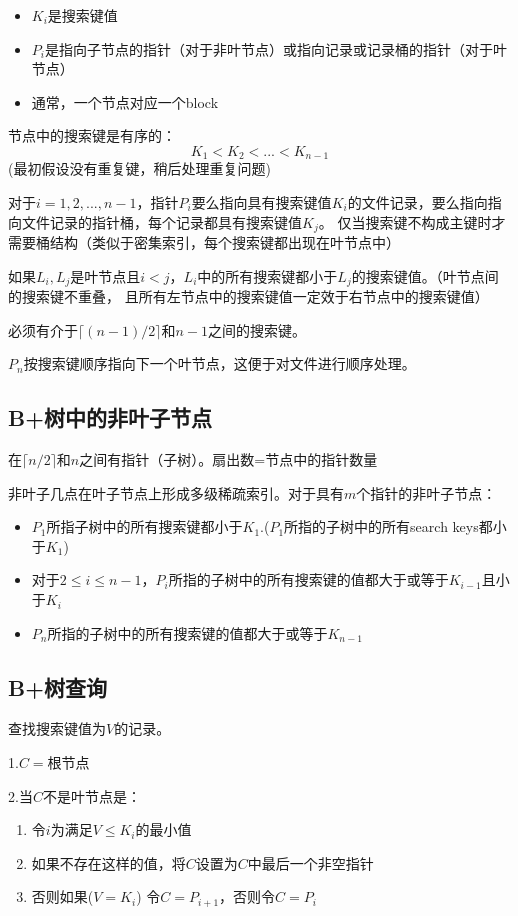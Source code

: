\begin{itemize}
    \item $K_i$是搜索键值
    \item $P_i$是指向子节点的指针（对于非叶节点）或指向记录或记录桶的指针（对于叶节点）
    \item 通常，一个节点对应一个block
\end{itemize}

节点中的搜索键是有序的：
$$K_1<K_2<...<K_{n-1}$$
(最初假设没有重复键，稍后处理重复问题)

对于$i=1,2,...,n-1$，指针$P_i$要么指向具有搜索键值$K_i$的文件记录，要么指向指向文件记录的指针桶，每个记录都具有搜索键值$K_j$。
仅当搜索键不构成主键时才需要桶结构（类似于密集索引，每个搜索键都出现在叶节点中）

如果$L_i,L_j$是叶节点且$i<j$，$L_i$中的所有搜索键都小于$L_j$的搜索键值。（叶节点间的搜索键不重叠，
且所有左节点中的搜索键值一定效于右节点中的搜索键值）

必须有介于$\lceil (n-1)/2 \rceil$和$n-1$之间的搜索键。

$P_n$按搜索键顺序指向下一个叶节点，这便于对文件进行顺序处理。

\subsection{B+树中的非叶子节点}

在$\lceil n/2 \rceil$和$n$之间有指针（子树）。扇出数=节点中的指针数量

非叶子几点在叶子节点上形成多级稀疏索引。对于具有$m$个指针的非叶子节点：

\begin{itemize}
    \item $P_1$所指子树中的所有搜索键都小于$K_1$.($P_1$所指的子树中的所有search keys都小于$K_1$)
    \item 对于$2\leq i\leq n-1$，$P_i$所指的子树中的所有搜索键的值都大于或等于$K_{i-1}$且小于$K_i$
    \item $P_n$所指的子树中的所有搜索键的值都大于或等于$K_{n-1}$
\end{itemize}

\subsection{B+树查询}

查找搜索键值为$V$的记录。

1.$C=$根节点

2.当$C$不是叶节点是：
\begin{enumerate}
    \item 令$i$为满足$V\leq K_i$的最小值
    \item 如果不存在这样的值，将$C$设置为$C$中最后一个非空指针
    \item 否则{如果($V=K_i$) 令$C=P_{i+1}$，否则令$C=P_i$}
\end{enumerate}

